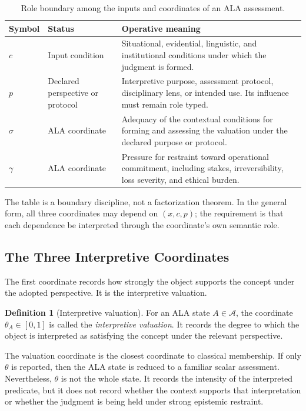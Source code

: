 \documentclass[reqno,final]{amsart}
\theoremstyle{definition}
\newtheorem{definition}{Definition}
\theoremstyle{plain}
\theoremstyle{remark}
\providecommand{\cA}{\mathcal{A}}
\begin{document}
\begin{table}[!htbp]
\centering
\caption{Role boundary among the inputs and coordinates of an ALA assessment.}
\label{tab:input-role-boundary}
\fontsize{9.5}{11.5}\selectfont
\setlength{\tabcolsep}{3pt}
\renewcommand{\arraystretch}{1.12}
\begin{tabularx}{\textwidth}{>{\raggedright\arraybackslash}p{}>{\raggedright\arraybackslash}p{}>{\raggedright\arraybackslash}X}
\toprule
Symbol & Status & Operative meaning \\
\midrule
\(c\) & Input condition & Situational, evidential, linguistic, and institutional conditions under which the judgment is formed. \\
\(p\) & Declared perspective or protocol & Interpretive purpose, assessment protocol, disciplinary lens, or intended use. Its influence must remain role typed. \\
\(\sigma\) & ALA coordinate & Adequacy of the contextual conditions for forming and assessing the valuation under the declared purpose or protocol. \\
\(\gamma\) & ALA coordinate & Pressure for restraint toward operational commitment, including stakes, irreversibility, loss severity, and ethical burden. \\
\bottomrule
\end{tabularx}
\end{table}

The table is a boundary discipline, not a factorization theorem. In the general form, all three coordinates may depend on \((x,c,p)\); the requirement is that each dependence be interpreted through the coordinate's own semantic role.

\subsection{The Three Interpretive Coordinates}
The first coordinate records how strongly the object supports the concept under the adopted perspective. It is the interpretive valuation.

\begin{definition}[Interpretive valuation]
For an ALA state \(A\in\cA\), the coordinate \(\theta_A\in[0,1]\) is called the \emph{interpretive valuation}. It records the degree to which the object is interpreted as satisfying the concept under the relevant perspective.
\end{definition}

The valuation coordinate is the closest coordinate to classical membership. If only \(\theta\) is reported, then the ALA state is reduced to a familiar scalar assessment. Nevertheless, \(\theta\) is not the whole state. It records the intensity of the interpreted predicate, but it does not record whether the context supports that interpretation or whether the judgment is being held under strong epistemic restraint.
\end{document}
